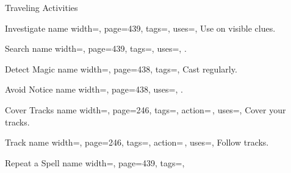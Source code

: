 \begin{PageFront}
\begin{Tables}{\frontTableHeight}
\begin{Table}{Traveling Activities}
\begin{entry}{Investigate}{%
                name width=\activityLength,%
                page=439,
                tags=\Concentrate,
                uses={\VariousKnowledge[tags=S]},
            }
                Use  on visible clues.\hfill
                \quad
            \end{entry}
            \begin{entry}{Search}{%
                name width=\activityLength,%
                page=439,
                tags=\Concentrate,
                uses={\Perception[tags=S]},
            }
                . \hfill
            \end{entry}
            \begin{entry}{Detect Magic}{%
                name width=\activityLength,%
                page=438,
                tags=\Concentrate,
            }
                Cast  regularly.\hfill
            \end{entry}
            \breakLine
            \begin{entry}{Avoid Notice}{%
                name width=\activityLength,%
                page=438,
                uses={\Stealth[tags=S]},
            }
                .  \hfill{}\quad {}
            \end{entry}
            \begin{entry}{Cover Tracks}{%
                name width=\activityLength,%
                page=246,
                tags=\Move\Concentrate,
                action=\,,
                uses={\Survival[tags=T]},
            }
                Cover your tracks.
            \end{entry}
            \begin{entry}{Track}{%
                name width=\activityLength,%
                page=246,
                tags=\Move\Concentrate,
                action=\,,
                uses={\Survival[tags=T]},
            }
                Follow tracks.\hfill {}\quad
            \end{entry}
            \breakLine
            \begin{entry}{Repeat a Spell}{%
                name width=\activityLength,%
                page=439,
                tags=\Concentrate,
            }

\end{entry}
\end{Table}
\end{Tables}
\end{PageFront}
